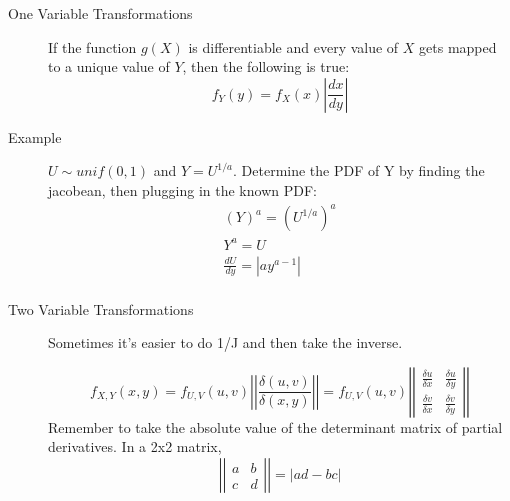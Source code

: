 \documentclass[10pt,landscape]{article}
\theoremstyle{definition}
\begin{document}
\begin{multicols}{3}
\begin{description}
    \item[One Variable Transformations] If the function $g(X)$ is differentiable and every value of $X$ gets mapped to a unique value of $Y$, then the following is true:
    \[f_Y(y) = f_X(x)\left|\frac{dx}{dy}\right| \] 
    \item[Example] $U \sim unif(0,1)$ and $Y=U^{1/a}$. Determine the PDF of Y by finding the jacobean, then plugging in the known PDF: 
    \begin{align*}
    (Y)^a=(U^{1/a})^a\\
    Y^a=U\\
    \frac{dU}{dy}=|ay^{a-1}|\\
    \end{align*}
    \begin{comment}
    To find $f_Y(y)$ as a function of $y$, plug in $x = g^{-1}(y)$.
    \[f_Y(y) = f_X(g^{-1}(y))\left|\frac{d}{dy}g^{-1}(y)\right|\]
    \end{comment}
   \item[Two Variable Transformations] Sometimes it's easier to do 1/J and then take the inverse. 
   \begin{comment}Similarily, let's say we know the joint distribution of $U$ and $V$ but are also interested in the random vector $(X, Y)$ found by $(X, Y) = g(U, V)$. If $g$ is differentiable and one-to-one, then the following is true:
   \end{comment}
     \[f_{X,Y}(x, y) = f_{U,V}(u,v) \left|\left| \frac{\delta(u, v)}{\delta(x, y)} \right|\right| = f_{U,V}(u,v)\left| \left| 
     \begin{array}{ccc}
         \frac{\delta u}{\delta x} & \frac{\delta u}{\delta y} \\
         \frac{\delta v}{\delta x} & \frac{\delta v}{\delta y} 
     \end{array}
     \right| \right|\] 
     Remember to take the absolute value of the determinant matrix of partial derivatives. In a 2x2 matrix, 
     \[ \left| \left|
     \begin{array}{ccc}
         a & b \\
         c & d
     \end{array}
     \right| \right| = |ad - bc|\]
     \begin{comment}
     The determinant of the matrix of partial derivatives is referred to the \textbf{Jacobian}, denoted as $J$.
     \[\left| \begin{array}{ccc}
         \frac{\delta u}{\delta x} & \frac{\delta u}{\delta y} \\
         \frac{\delta v}{\delta x} & \frac{\delta v}{\delta y} 
     \end{array}\right| = J\]
	\end{comment}
\end{description}



\end{multicols}
\end{document}
